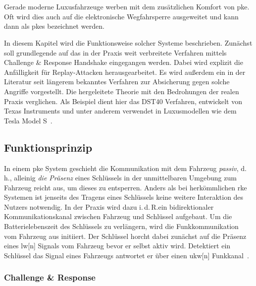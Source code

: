 \chapter{}

Gerade moderne Luxusfahrzeuge werben mit dem zusätzlichen Komfort von \gls{pke}. Oft wird dies auch auf die elektronische Wegfahrsperre ausgeweitet und kann dann als \gls{pkes} bezeichnet werden.

In diesem Kapitel wird die Funktionsweise solcher Systeme beschrieben. Zunächst soll grundlegende auf das in der Praxis weit verbreitete Verfahren mittels \foreignlanguage{english}{Challenge \& Response Handshake} eingegangen werden. Dabei wird explizit die Anfälligkeit für \foreignlanguage{english}{Replay}-Attacken herausgearbeitet. Es wird außerdem ein in der Literatur seit längerem bekanntes Verfahren zur Absicherung gegen solche Angriffe vorgestellt. Die hergeleitete Theorie mit den Bedrohungen der realen Praxis verglichen. Als Beispiel dient hier das DST40 Verfahren, entwickelt von Texas Instruments und unter anderem verwendet in Luxusmodellen wie dem Tesla Model S~\cite{Wouters2019}.

\section{Funktionsprinzip}

In einem \gls{pke} System geschieht die Kommunikation mit dem Fahrzeug \emph{passiv}, d.\,h., alleinig \emph{die Präsenz} eines Schlüssels in der unmittelbaren Umgebung zum Fahrzeug reicht aus, um dieses zu entsperren. Anders als bei herkömmlichen \gls{rke} Systemen ist jenseits des Tragens eines Schlüssels keine weitere Interaktion des Nutzers notwendig. In der Praxis wird dazu i.\,d.\,R.\@ ein bidirektionaler Kommunikationskanal zwischen Fahrzeug und Schlüssel aufgebaut. Um die Batterielebenszeit des Schlüssels zu verlängern, wird die Funkkommunikation vom Fahrzeug aus initiiert. Der Schlüssel horcht dabei zunächst auf die Präsenz eines \gls{lw}[n] Signals vom Fahrzeug bevor er selbst aktiv wird. Detektiert ein Schlüssel das Signal eines Fahrzeugs antwortet er über einen \gls{ukw}[n] Funkkanal~\cite{Alrabady2005,Verdult2015,Garcia2016}.

\subsection{\foreignlanguage{english}{Challenge \& Response}}

